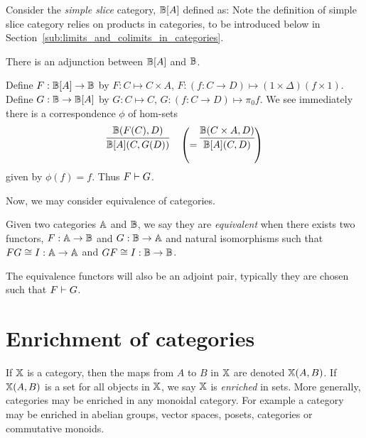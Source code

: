 \begin{example}\label{ex:simple-slice-adjoint}
  Consider the  \emph{simple slice} category\cite{blute2009cartesian}, $\mathbb{B}[A]$  defined as:
  Note the definition of simple slice category relies on products in categories, to be introduced
  below in Section~\ref{sub:limits_and_colimits_in_categories}.

  There is an adjunction between $\mathbb{B}[A]$ and $\mathbb{B}$.

  Define $F:\mathbb{B}[A]\to \mathbb{B}$ by $F:C \mapsto C\times A$, $F:(f:C\to D) \mapsto (1\times \Delta) (f\times
  1)$.
  Define $G:\mathbb{B} \to \mathbb{B}[A]$ by $G:C\mapsto C$, $G:(f:C\to D) \mapsto \pi_0 f$. We see immediately
  there is a  correspondence $\phi$ of hom-sets
  \[
    \infer{\B[A](C,G(D))}{\B(F(C), D)}
    \quad \left(= \infer{\B[A](C,D)}{\B(C\times A, D)}\right)
  \]
  given by $\phi(f) = f$.
  Thus $F\vdash G$.
\end{example}

Now, we may consider equivalence of categories.

\begin{definition}\label{def:equivalence_of_categories}
  Given two categories $\mathbb{A}$ and $\mathbb{B}$, we say they are \emph{equivalent} when there exists two
  functors, $F:\mathbb{A} \to \mathbb{B}$ and $G:\mathbb{B} \to \mathbb{A}$ and natural isomorphisms such that $F G \cong I:\mathbb{A} \to
  \mathbb{A}$ and $G F \cong I:\mathbb{B} \to \mathbb{B}$.
\end{definition}


The equivalence functors will also be an adjoint pair, typically they are chosen such that
$F\vdash G$.

\section{Enrichment of categories} %
\label{sub:enrichement_of_categories}

If $\mathbb{X}$ is a category, then the maps from $A$ to $B$ in $\mathbb{X}$ are denoted $\mathbb{X}(A,B)$.
If $\mathbb{X}(A,B)$ is a set for all objects in $\mathbb{X}$, we say $\mathbb{X}$ is \emph{enriched} in sets. More generally,
categories may be enriched in any monoidal category. For example a category may be
enriched in abelian groups, vector spaces, posets, categories or commutative monoids.

